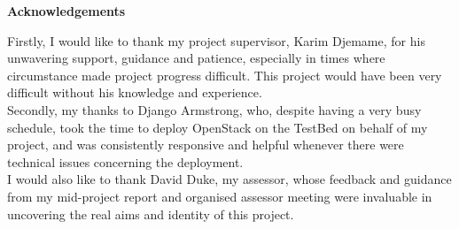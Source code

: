 \begin{center}
    {\LARGE\bf Acknowledgements}
\end{center}

Firstly, I would like to thank my project supervisor, Karim Djemame, for his unwavering support, guidance and patience, especially in times where circumstance made project progress difficult. This project would have been very difficult without his knowledge and experience. \\

Secondly, my thanks to Django Armstrong, who, despite having a very busy schedule, took the time to deploy OpenStack on the TestBed on behalf of my project, and was consistently responsive and helpful whenever there were technical issues concerning the deployment. \\

I would also like to thank David Duke, my assessor, whose feedback and guidance from my mid-project report and organised assessor meeting were invaluable in uncovering the real aims and identity of this project.  

